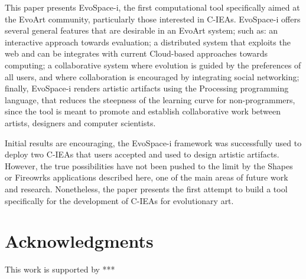 \documentclass{sig-alternate}
\begin{document}
This paper presents EvoSpace-i, the first computational tool specifically aimed at the EvoArt community, particularly those interested in C-IEAs.
EvoSpace-i offers several general features that are desirable in an EvoArt system; such as:
an interactive approach towards evaluation; a distributed system that exploits the web and can be integrates with current Cloud-based approaches towards computing;
a collaborative system where evolution is guided by the preferences of all users, and where collaboration is encouraged by integrating social networking;
finally, EvoSpace-i renders artistic artifacts using the Processing programming language, that reduces the steepness of the learning curve for non-programmers,
since the tool is meant to promote and establish collaborative work between artists, designers and computer scientists. 

Initial results are encouraging, the EvoSpace-i framework was successfully used to deploy two C-IEAs that users accepted and used to design artistic artifacts.
However, the true possibilities have not been pushed to the limit by the Shapes or Fireowrks applications described here, one of the main areas of future work and research.
Nonetheless, the paper presents the first attempt to build a tool specifically for the development of C-IEAs for evolutionary art.



\section{Acknowledgments}
This work is supported by ***


%

%
%
\end{document}
